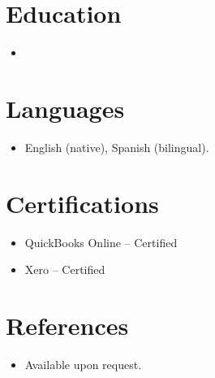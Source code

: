 \documentclass[11pt,a4paper,sans]{moderncv}
\begin{document}

\section{Education}
\vspace{1pt}
\begin{itemize}

\item{}

\end{itemize}


\section{Languages}
\vspace{1pt}
\begin{itemize}
\item English (native), Spanish (bilingual).
\end{itemize}


\section{Certifications}
\vspace{1pt}
\begin{itemize}
\item QuickBooks Online -- Certified
\item Xero -- Certified
\end{itemize}


\section{References}
\vspace{1pt}
\begin{itemize}
\item{Available upon request.}
\end{itemize}
\end{document}
